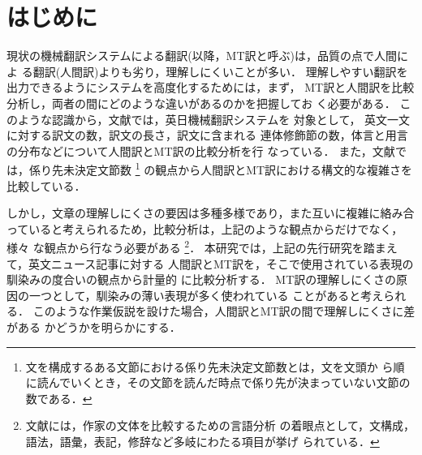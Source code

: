 


\maketitle

\section{はじめに}
\label{sec:intro}

現状の機械翻訳システムによる翻訳(以降，MT訳と呼ぶ)は，品質の点で人間によ
る翻訳(人間訳)よりも劣り，理解しにくいことが多い． 
理解しやすい翻訳を出力できるようにシステムを高度化するためには，まず，
MT訳と人間訳を比較分析し，両者の間にどのような違いがあるのかを把握してお 
く必要がある．
このような認識から，文献\cite{Yoshimi03}では，英日機械翻訳システムを
対象として， 英文一文に対する訳文の数，訳文の長さ，訳文に含まれる
連体修飾節の数，体言と用言の分布などについて人間訳とMT訳の比較分析を行
なっている． 
また，文献\cite{Yoshimi04}では，係り先未決定文節数
\footnote{文を構成するある文節における係り先未決定文節数とは，文を文頭か
ら順に読んでいくとき，その文節を読んだ時点で係り先が決まっていない文節の
数である\cite{Murata99}．} 
の観点から人間訳とMT訳における構文的な複雑さを比較している．

しかし，文章の理解しにくさの要因は多種多様であり，また互いに複雑に絡み合
っていると考えられるため，比較分析は，上記のような観点からだけでなく，様々
な観点から行なう必要がある
\footnote{文献\cite{Nakamura93}には，作家の文体を比較するための言語分析
の着眼点として，文構成，語法，語彙，表記，修辞など多岐にわたる項目が挙げ
られている．}．
本研究では，上記の先行研究を踏まえて，英文ニュース記事に対する
人間訳とMT訳を，そこで使用されている表現の馴染みの度合いの観点から計量的
に比較分析する． 
MT訳の理解しにくさの原因の一つとして，馴染みの薄い表現が多く使われている
ことがあると考えられる．
このような作業仮説を設けた場合，人間訳とMT訳の間で理解しにくさに差がある
かどうかを明らかにする．

